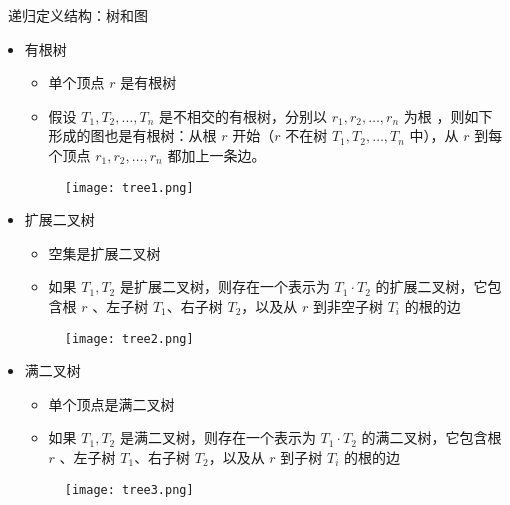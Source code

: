 \documentclass[UTF8]{report}
\theoremstyle{MyLineTheoremStyle} %
\theoremstyle{MyBlockTheoremStyle} %
\theoremstyle{MySubsubsectionStyle} %
\begin{document}
\textbullet\ 递归定义结构：树和图
\begin{itemize}
    \item 有根树
    \begin{itemize}
        \item 单个顶点 $r$ 是有根树
        \item 假设 $T_1, T_2, \ldots , T_n$ 是不相交的有根树，分别以 $r_1, r_2, \ldots , r_n$ 为根 ，则如下形成的图也是有根树：从根 $r$ 开始（$r$ 不在树 $T_1, T_2, \ldots , T_n$ 中），从 $r$ 到每个顶点 $r_1, r_2, \ldots , r_n$ 都加上一条边。
    \end{itemize}
    \begin{figure}[H]
        \centering
        \texttt{[image: tree1.png]}
    \end{figure}
    \item 扩展二叉树
    \begin{itemize}
        \item 空集是扩展二叉树
        \item 如果 $T_1, T_2$ 是扩展二叉树，则存在一个表示为 $T_1 \cdot T_2$ 的扩展二叉树，它包含根 $r$ 、左子树 $T_1$、右子树 $T_2$，以及从 $r$ 到非空子树 $T_i$ 的根的边
    \end{itemize}
    \begin{figure}[H]
        \centering
        \texttt{[image: tree2.png]}
    \end{figure}
    \item 满二叉树
    \begin{itemize}
        \item 单个顶点是满二叉树
        \item 如果 $T_1, T_2$ 是满二叉树，则存在一个表示为 $T_1 \cdot T_2$ 的满二叉树，它包含根 $r$ 、左子树 $T_1$、右子树 $T_2$，以及从 $r$ 到子树 $T_i$ 的根的边
    \end{itemize}
    \begin{figure}[H]
        \centering
        \texttt{[image: tree3.png]}
    \end{figure}
\end{itemize}
\end{document}
